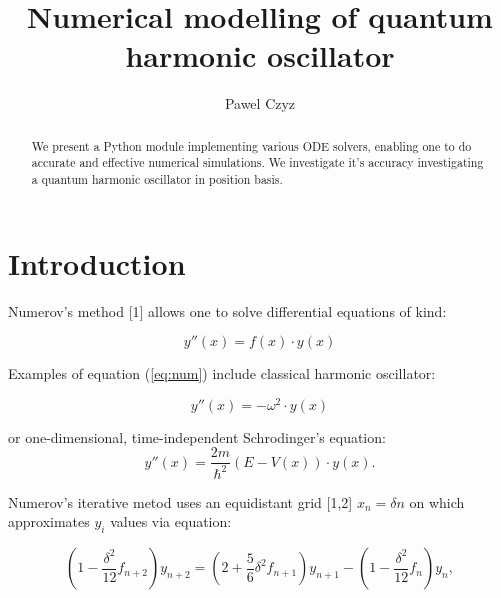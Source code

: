 \documentclass{llncs}
\begin{document}
\title{Numerical modelling of quantum harmonic oscillator}
\author{Pawel Czyz}



\maketitle

\begin{abstract}
We present a Python module implementing various ODE solvers, enabling one to do accurate and effective numerical simulations. We investigate it's accuracy investigating a quantum harmonic oscillator in position basis.

\end{abstract}

\section{Introduction}
Numerov's method [1] allows one to solve differential equations of kind:

\begin{equation}
\label{eq:num}
	y''(x) = f(x)\cdot y(x)
\end{equation}

Examples of equation (\ref{eq:num}) include classical harmonic oscillator:

\begin{equation}
\label{eq:harm}
	y''(x) = -\omega^2\cdot y(x)
\end{equation}

or one-dimensional, time-independent Schrodinger's equation:
\begin{equation}
\label{eq:quant}
	y''(x)=\frac{2m}{\hbar^2}(E-V(x))\cdot y(x).
\end{equation}

Numerov's iterative metod uses an equidistant grid [1,2] $x_n=\delta n$ on which approximates $y_i$ values via equation:

\begin{equation}
\label{eq:iter}
	\left(1-\frac {\delta^2}{12}f_{n+2}\right)y_{n+2}=\left(2+\frac 56\delta^2 f_{n+1}\right)y_{n+1}-\left(1-\frac{\delta^2}{12}f_n\right)y_n,
\end{equation}
\end{document}
